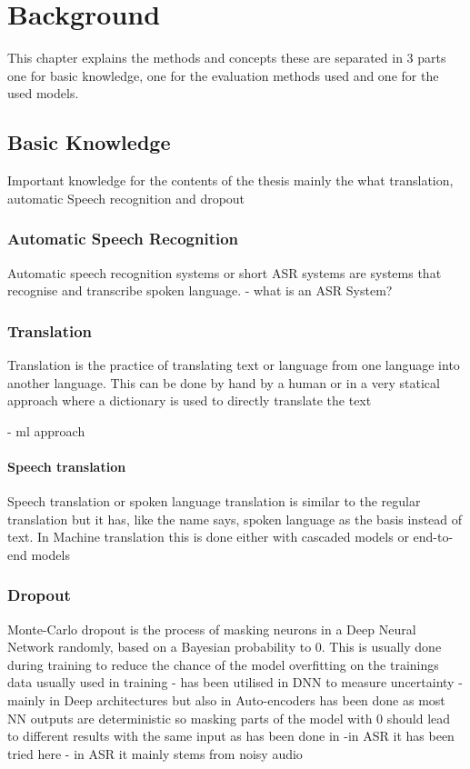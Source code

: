 \chapter{Background}
\label{ch:background}
This chapter explains the methods and concepts these are separated in 3 parts one for basic knowledge, one for the evaluation methods used and one for the used models. 

\section{Basic Knowledge}
Important knowledge for the contents of the thesis mainly the what translation, automatic Speech recognition and dropout


\subsection{Automatic Speech Recognition}
Automatic speech recognition systems or short ASR systems are systems that recognise and transcribe spoken language. 
- what is an ASR System? 


\subsection{Translation}
Translation is the practice of translating text or language from one language into another language. This can be done by hand by a human or in a very statical approach where a dictionary is used to directly translate the text 

- ml approach

\subsubsection{Speech translation}
Speech translation or spoken language translation is similar to the regular translation but it has, like the name says, spoken language as the basis instead of text. 
In Machine translation this is done either with cascaded models or end-to-end models 



\subsection{Dropout}
Monte-Carlo dropout is the process of masking neurons in a Deep Neural Network randomly, based on a Bayesian probability to 0. This is usually done during training to reduce the chance of the model overfitting on the trainings data 
usually used in training 
- has been utilised in DNN to measure uncertainty
- mainly in Deep architectures but also in Auto-encoders
has been done as most NN outputs are deterministic so masking parts of the model with 0 should lead to different results with the same input as has been done in \cite{gal2016dropoutbayesianapproximationrepresenting}
-in ASR it has been tried here  \cite{8683086}
- in ASR it mainly stems from noisy audio 


